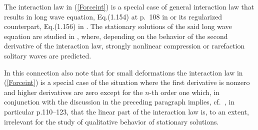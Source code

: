 \documentclass[12pt]{article}
\begin{document}
The interaction law in (\ref{Forceint}) is a special case of general interaction law that results in long wave equation, Eq.(1.154) at p.~108 in \cite{Nester_02} or its regularized counterpart, Eq.(1.156) in \cite{Nester_02}. The stationary solutions of the said long wave equation are studied in \cite{Nester_02}, where, depending on the behavior of the second derivative of the interaction law, strongly nonlinear compression or rarefaction solitary waves are predicted.

In this connection also note that for small deformations the interaction law in (\ref{Forceint}) is a special case of the situation where the first derivative is nonzero and higher derivatives are zero except for the $n$-th order one which, in conjunction with the discussion in the preceding paragraph implies, cf.\ \cite{Nester_02}, in particular p.110--123, that the linear part of the interaction law is, to an extent, irrelevant for the study of qualitative behavior of stationary solutions.
\end{document}
